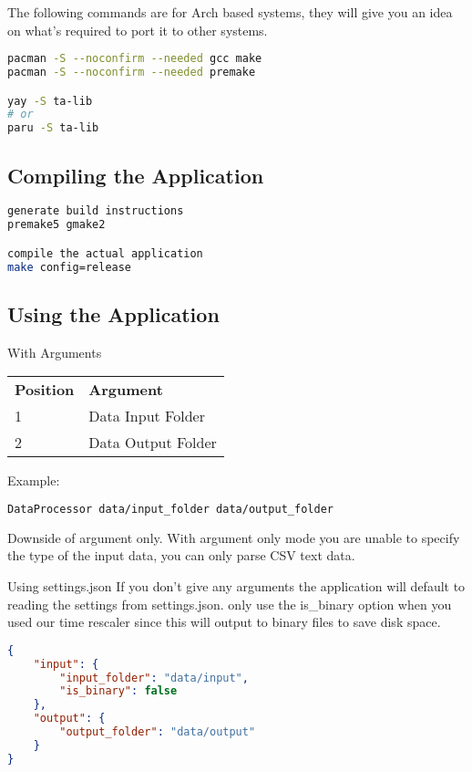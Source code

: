 \documentclass[12pt,a4paper]{article}
\begin{document}
The following commands are for Arch based systems, they will give you an idea on what's required to port it to other systems.

\begin{lstlisting}[language=bash]
pacman -S --noconfirm --needed gcc make
pacman -S --noconfirm --needed premake

yay -S ta-lib
# or
paru -S ta-lib
\end{lstlisting}

\subsection{Compiling the Application}

\begin{lstlisting}[language=bash]
generate build instructions
premake5 gmake2

compile the actual application
make config=release
\end{lstlisting}

\subsection{Using the Application}

With Arguments
\begin{table}[H]
\begin{tabular}{ll}
\textbf{Position} & \textbf{Argument}  \\
1                 & Data Input Folder  \\
2                 & Data Output Folder
\end{tabular}
\end{table}

Example:
\begin{lstlisting}[language=bash]
DataProcessor data/input_folder data/output_folder
\end{lstlisting}

Downside of argument only.
With argument only mode you are unable to specify the type of the input data, you can only parse CSV text data.

Using settings.json
If you don't give any arguments the application will default to reading the settings from settings.json. only use the is\_binary option when you used our time rescaler since this will output to binary files to save disk space.

\begin{lstlisting}[language=json]
{
    "input": {
        "input_folder": "data/input",
        "is_binary": false
    },
    "output": {
        "output_folder": "data/output"
    }
}
\end{lstlisting}
\end{document}

